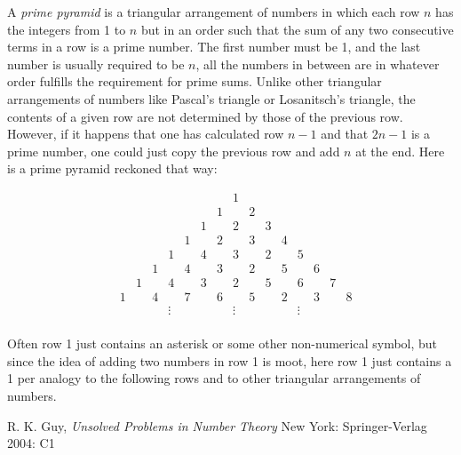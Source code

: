 \documentclass[12pt]{article}
\begin{document}
A {\em prime pyramid} is a triangular arrangement of numbers in which each row $n$ has the integers from 1 to $n$ but in an order such that the sum of any two consecutive terms in a row is a prime number. The first number must be 1, and the last number is usually required to be $n$, all the numbers in between are in whatever order fulfills the requirement for prime sums. Unlike other triangular arrangements of numbers like Pascal's triangle or Losanitsch's triangle, the contents of a given row are not determined by those of the previous row. However, if it happens that one has calculated row $n - 1$ and that $2n - 1$ is a prime number, one could just copy the previous row and add $n$ at the end. Here is a prime pyramid reckoned that way:

\[
\begin{array}{cccccccccccccccccc}
& & & & & & & & & 1 & & & & & & & &\\
& & & & & & & & 1 & & 2 & & & & & & &\\
& & & & & & & 1 & & 2 & & 3 & & & & & &\\
& & & & & & 1 & & 2 & & 3 & & 4 & & & & &\\
& & & & & 1 & & 4 & & 3 & & 2 & & 5 & & & &\\
& & & & 1 & & 4 & & 3 & & 2 & & 5 & & 6 & & &\\
& & & 1 & & 4 & & 3 & & 2 & & 5 & & 6 & & 7 & &\\
& & 1 & & 4 & & 7 & & 6 & & 5 & & 2 & & 3 & & 8 &\\
& & & & &\vdots & & & & \vdots & & & & \vdots& & & & \\
\end{array}
\]

Often row 1 just contains an asterisk or some other non-numerical symbol, but since the idea of adding two numbers in row 1 is moot, here row 1 just contains a 1 per analogy to the following rows and to other triangular arrangements of numbers. %

\begin{thebibliography}{2}
 R. K. Guy, {\it Unsolved Problems in Number Theory} New York: Springer-Verlag 2004: C1
\end{thebibliography}
\end{document}
